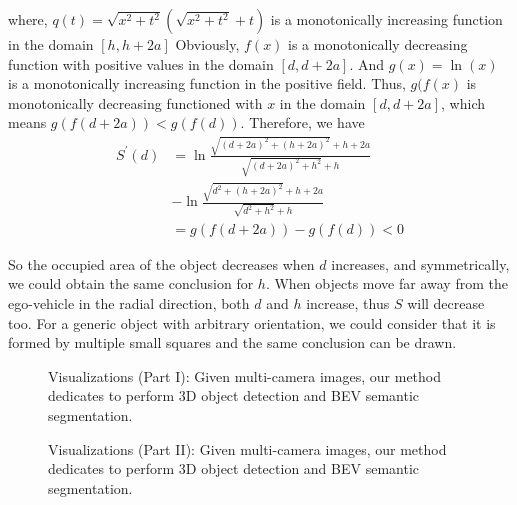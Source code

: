 \documentclass[letterpaper]{article} \usepackage{aaai23}  \usepackage{times}  \usepackage{helvet}  \usepackage{courier}  \usepackage[hyphens]{url}  \usepackage{graphicx} \urlstyle{rm} \def\UrlFont{\rm}  \usepackage{natbib}  \usepackage{caption} \frenchspacing  \setlength{\pdfpagewidth}{8.5in} \setlength{\pdfpageheight}{11in} \usepackage{algorithm}
\begin{document}
where, $q(t)=\sqrt{x^2+t^2}(\sqrt{x^2+t^2}+t)$ is a monotonically increasing function in the domain $[h,h+2a]$
Obviously, $f(x)$ is a monotonically decreasing function with positive values in the domain $[d,d+2a]$. And $g(x)=\ln(x)$ is a monotonically increasing function in the positive field. Thus, $g(f(x)$ is monotonically decreasing functioned with $x$ in the domain $[d,d+2a]$, which means $g(f(d+2a))< g(f(d))$. Therefore, we have
\begin{align*}\tag{8}
S^{\prime}(d)
&=\ln\frac{\sqrt{(d+2a)^2+(h+2a)^2}+h+2a}{\sqrt{(d+2a)^2+h^2}+h} \\
&-\ln\frac{\sqrt{d^2+(h+2a)^2}+h+2a}{\sqrt{d^2+h^2}+h} \\
&=g(f(d+2a))-g(f(d))< 0
\end{align*}

So the occupied area of the object decreases when $d$ increases, and symmetrically, we could obtain the same conclusion for $h$. When objects move far away from the ego-vehicle in the radial direction, both $d$ and $h$ increase, thus $S$ will decrease too. For a generic object with arbitrary orientation, we could consider that it is formed by multiple small squares and the same conclusion can be drawn. 
\begin{figure*}[h]
     \centering
     \begin{subfigure}[b]{\textwidth}
         \centering
\label{fig:1}
     \end{subfigure}
     \vfill
     \begin{subfigure}[b]{\textwidth}
         \centering
\label{fig:2}
     \end{subfigure}
     \caption{Visualizations (Part I): Given multi-camera images, our method dedicates to perform 3D object detection and BEV semantic segmentation.}
     \label{fig:supp_vis_1}
\end{figure*}
\begin{figure*}[htbp]
\centering
\begin{subfigure}[b]{\textwidth}
         \centering
\label{fig:3}
     \end{subfigure}
     \vfill
     \begin{subfigure}[b]{\textwidth}
         \centering
\label{fig:4}
     \end{subfigure}
      \caption{Visualizations (Part II): Given multi-camera images, our method dedicates to perform 3D object detection and BEV semantic segmentation.}
     \label{fig:supp_vis_2}
\end{figure*}
\end{document}
